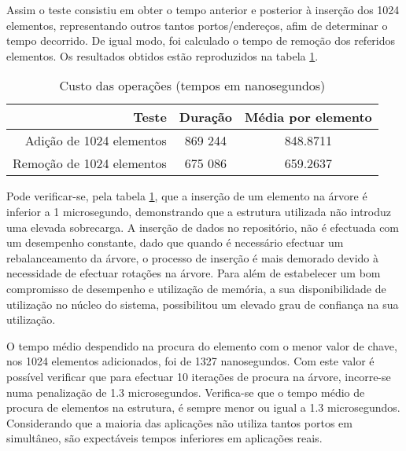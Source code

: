 Assim o teste consistiu em obter o tempo anterior e posterior à inserção dos 1024 elementos, representando outros tantos portos/endereços, afim de determinar o tempo decorrido.
De igual modo, foi calculado o tempo de remoção dos referidos elementos.
Os resultados obtidos estão reproduzidos na tabela \ref{tab:tree_info}.
 
\begin{table}[!htb]
\begin{center}
\caption{Custo das operações (tempos em nanosegundos)}
\begin{tabular}{ | r | c | c | }
\hline
\hspace{1cm} Teste \hspace{1.5cm} & \hspace{1cm}Duração\hspace{1cm} &  Média por
elemento \\
\hline
Adição de 1024 elementos & 869 244 & 848.8711 \\
\hline
Remoção de 1024 elementos & 675 086 & 659.2637\\
\hline

\hline
\end{tabular}
\label{tab:tree_info}
\end{center}
\end{table}

Pode verificar-se, pela tabela \ref{tab:tree_info}, que a inserção de um elemento na árvore é inferior a 1 microsegundo, demonstrando que a estrutura utilizada não introduz uma elevada sobrecarga.
A inserção de dados no repositório, não é efectuada com um desempenho constante, dado que quando é necessário efectuar um rebalanceamento da árvore, o processo de inserção é mais demorado devido à necessidade de efectuar rotações na árvore.
Para além de estabelecer um bom compromisso de desempenho e utilização de memória, a sua disponibilidade de utilização no núcleo do sistema, possibilitou um elevado grau de confiança na sua utilização.

O tempo médio despendido na procura do elemento com o menor valor de chave, nos 1024 elementos adicionados, foi de 1327 nanosegundos.
Com este valor é possível verificar que para efectuar 10 iterações de procura na árvore, incorre-se numa penalização de 1.3 microsegundos.
Verifica-se que o tempo médio de procura de elementos na estrutura, é sempre menor ou igual a 1.3 microsegundos.
Considerando que a maioria das aplicações não utiliza tantos portos em simultâneo, são expectáveis tempos inferiores em aplicações reais.

